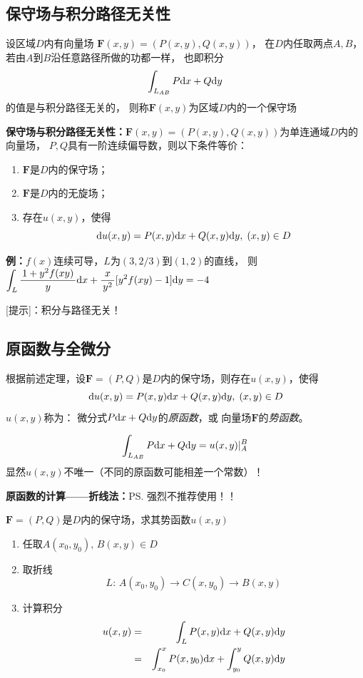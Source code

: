 \subsection{保守场与积分路径无关性}

设区域$D$内有向量场
$\bm{F}(x,y)=(P(x,y),Q(x,y))$，
在$D$内任取两点$A,B$，若由$A$到$B$沿任意路径所做的功都一样，
也即积分
$$\displaystyle\int_{L_{AB}}P\mathrm{d} x+Q\mathrm{d} y$$
的值是与积分路径无关的，
则称$\bm{F}(x,y)$为区域$D$内的一个保守场

\begin{thx}
	{\bf 保守场与积分路径无关性：}$\bm{F}(x,y)=(P(x,y),Q(x,y))$为单连通域$D$内的向量场，
	$P,Q$具有一阶连续偏导数，则以下条件等价：
	\begin{enumerate}[(1)]
	  \item $\bm{F}$是$D$内的保守场；
	  \item $\bm{F}$是$D$内的无旋场；
	  \item 存在$u(x,y)$，使得
	  $$\mathrm{d} u(x,y)=P(x,y)\mathrm{d} x+Q(x,y)\mathrm{d} y,\;(x,y)\in D$$
	\end{enumerate}
\end{thx}

{\bf 例：}$f(x)$连续可导，$L$为$(3,2/3)$到$(1,2)$的直线，
则$\displaystyle\int_L\displaystyle\frac{\,{1+y^2f(xy)}\,}{\,{y}\,}\mathrm{d} x+\displaystyle\frac{\,{x}\,}{\,{y^2}\,}[y^2f(xy)-1]\mathrm{d} y=-4$

[提示]：积分与路径无关！

\subsection{原函数与全微分}

根据前述定理，设$\bm{F}=(P,Q)$是$D$内的保守场，则存在$u(x,y)$，使得
$$\mathrm{d} u(x,y)=P(x,y)\mathrm{d} x+Q(x,y)\mathrm{d} y,\;(x,y)\in D$$
 $u(x,y)$称为： 微分式$P\mathrm{d} x+Q\mathrm{d} y$的{\it 原函数}，或
向量场$\bm{F}$的{\it 势函数}。

$${\displaystyle\int_{L_{AB}}P\mathrm{d} x+Q\mathrm{d} y=u(x,y)|_A^B} $$
显然$u(x,y)$不唯一（不同的原函数可能相差一个常数）！

{\bf 原函数的计算——折线法：}\ps{强烈不推荐使用！！}

$\bm{F}=(P,Q)$是$D$内的保守场，求其势函数$u(x,y)$
\begin{enumerate}[Step-1:]
  \setlength{\itemindent}{1cm}
  \item 任取$A(x_0,y_0),\,B(x,y)\in D$ 
  \item 取折线
  $${L:\,A(x_0,y_0)\to C(x,y_0)\to B(x,y)} $$
  \item 计算积分
  \begin{eqnarray*}
  	u(x,y)&=&\displaystyle\int_LP(x,y)\mathrm{d} x+Q(x,y)\mathrm{d} y \\
  	&=&{\displaystyle\int_{x_0}^xP(x,y_0)\mathrm{d} x+\displaystyle\int_{y_0}^yQ(x,y)\mathrm{d} y}
  \end{eqnarray*}
\end{enumerate}

